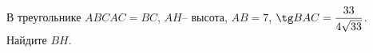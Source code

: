 \begin{ex}
	\begin{condition}
		В треугольнике \( ABC AC = BC \), \( AH – \) высота, \(AB=7\),  \( \tg BAC=\dfrac{33}{4\sqrt{33}} \).  Найдите \( BH \).
	\end{condition}
\end{ex}